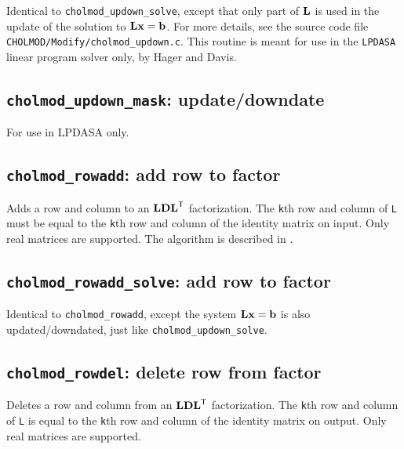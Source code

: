 \documentclass[11pt]{article}
\newcommand{\m}[1]{{\bf{#1}}}       %
\newcommand{\tr}{^{\sf T}}          %
\begin{document}

Identical to {\tt cholmod\_updown\_solve}, except that only part of $\m{L}$
is used in the update of the solution to $\m{Lx}=\m{b}$.  For more details,
see the source code file {\tt CHOLMOD/Modify/cholmod\_updown.c}.
This routine is meant for use in the {\tt LPDASA} linear program solver only,
by Hager and Davis.

\subsection{{\tt cholmod\_updown\_mask}: update/downdate}


For use in LPDASA only.

\newpage \subsection{{\tt cholmod\_rowadd}: add row to factor}


Adds a row and column to an $\m{LDL}\tr$ factorization.  The {\tt k}th
row and column of {\tt L} must be equal to the {\tt k}th row and
column of the identity matrix on input.
Only real matrices are supported.
The algorithm is described in \cite{DavisHager05}.

\subsection{{\tt cholmod\_rowadd\_solve}: add row to factor}


Identical to {\tt cholmod\_rowadd}, except the system $\m{Lx}=\m{b}$ is also updated/downdated, just like {\tt cholmod\_updown\_solve}.

\newpage \subsection{{\tt cholmod\_rowdel}: delete row from factor}


Deletes a row and column from an $\m{LDL}\tr$ factorization.  The {\tt k}th
row and column of {\tt L} is equal to the {\tt k}th row and
column of the identity matrix on output.
Only real matrices are supported.
\end{document}

